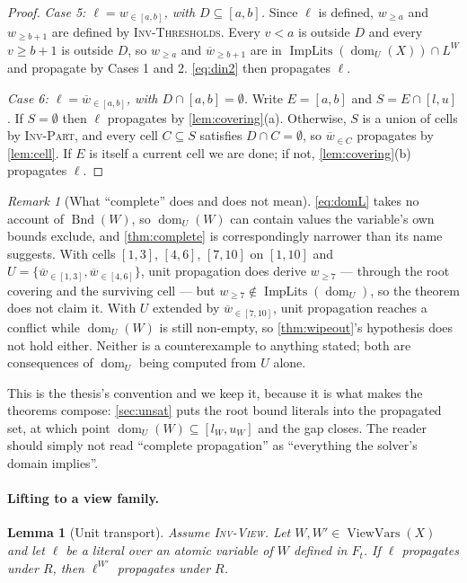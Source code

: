 \documentclass[11pt,a4paper]{article}
\theoremstyle{plain}
\newtheorem{lemmaN}{Lemma}
\theoremstyle{definition}
\theoremstyle{remark}
\newtheorem*{remark}{Remark}
\newcommand{\fname}[1]{\ensuremath{\operatorname{#1}}}
\newcommand{\Bnd}{\fname{Bnd}}
\newcommand{\ViewVars}{\fname{ViewVars}}
\newcommand{\dm}{\fname{dom}}
\newcommand{\ImpLits}{\fname{ImpLits}}
\newcommand{\atge}[2]{#1_{\geq #2}}
\newcommand{\atin}[3]{#1_{\in[#2,#3]}}
\newcommand{\natge}[2]{\overline{#1}_{\geq #2}}
\newcommand{\natin}[3]{\overline{#1}_{\in[#2,#3]}}
\newcommand{\natset}[2]{\overline{#1}_{\in #2}}
\newcommand{\inv}[1]{\textnormal{\textsc{Inv-#1}}}
\newcommand{\invThresholds}{\inv{Thresholds}}
\newcommand{\invPart}{\inv{Part}}
\newcommand{\invView}{\inv{View}}
\begin{document}
\begin{proof}
\emph{Case 5: $\ell=\atin{w}{a}{b}$, with $D\subseteq[a,b]$.}  Since $\ell$ is
defined, $\atge{w}{a}$ and $\atge{w}{b+1}$ are defined by \invThresholds{}.  Every
$v<a$ is outside $D$ and every $v\geq b+1$ is outside $D$, so
$\atge{w}{a}$ and $\natge{w}{b+1}$ are in
$\ImpLits(\dm_U(X))\cap L^W$ and propagate by Cases 1 and 2.  \cref{eq:din2}
then propagates $\ell$.

\emph{Case 6: $\ell=\natin{w}{a}{b}$, with $D\cap[a,b]=\emptyset$.}
Write $E=[a,b]$ and $S=E\cap[l,u]$.  If $S=\emptyset$ then $\ell$ propagates by
\cref{lem:covering}(a).  Otherwise, $S$ is a union of cells by \invPart{}, and
every cell $C\subseteq S$ satisfies $D\cap C=\emptyset$, so $\natset{w}{C}$
propagates by \cref{lem:cell}.  If $E$ is itself a current cell we are done; if
not, \cref{lem:covering}(b) propagates $\ell$.
\end{proof}

\begin{remark}[What ``complete'' does and does not mean]
\label{rem:domlimits}
\cref{eq:domL} takes no account of $\Bnd(W)$, so $\dm_U(W)$ can contain values
the variable's own bounds exclude, and \cref{thm:complete} is correspondingly
narrower than its name suggests.  With cells $[1,3]$, $[4,6]$, $[7,10]$ on
$[1,10]$ and $U = \{\natset{w}{[1,3]}, \natset{w}{[4,6]}\}$, unit propagation does
derive $\atge{w}{7}$ --- through the root covering and the surviving cell --- but
$\atge{w}{7}\notin\ImpLits(\dm_U)$, so the theorem does not claim it.  With
$U$ extended by $\natset{w}{[7,10]}$, unit propagation reaches a conflict while
$\dm_U(W)$ is still non-empty, so \cref{thm:wipeout}'s hypothesis does not hold
either.  Neither is a counterexample to anything stated; both are consequences of
$\dm_U$ being computed from $U$ alone.

This is the thesis's convention and we keep it, because it is what makes the
theorems compose: \cref{sec:unsat} puts the root bound literals into the
propagated set, at which point $\dm_U(W)\subseteq[l_W,u_W]$ and the gap closes.
The reader should simply not read ``complete propagation'' as ``everything the
solver's domain implies''.
\end{remark}

\paragraph{Lifting to a view family.}

\begin{lemmaN}[Unit transport]
\label{lem:transport}
Assume \invView{}.  Let $W,W'\in\ViewVars(X)$ and let $\ell$ be a literal over an
atomic variable of $W$ defined in $F_t$.  If $\ell$ propagates under $R$, then
$\ell^{W'}$ propagates under $R$.
\end{lemmaN}
\end{document}
